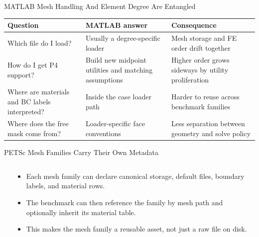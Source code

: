 \documentclass[aspectratio=169,10pt]{beamer}
\begin{document}

\begin{frame}{MATLAB Mesh Handling And Element Degree Are Entangled}
\small
\begin{tabularx}{\textwidth}{p{}p{}Y}
\toprule
\textbf{Question} & \textbf{MATLAB answer} & \textbf{Consequence} \\
\midrule
Which file do I load? & Usually a degree-specific loader & Mesh storage and FE order drift together \\
How do I get P4 support? & Build new midpoint utilities and matching assumptions & Higher order grows sideways by utility proliferation \\
Where are materials and BC labels interpreted? & Inside the case loader path & Harder to reuse across benchmark families \\
Where does the free mask come from? & Loader-specific face conventions & Less separation between geometry and solve policy \\
\bottomrule
\end{tabularx}
\end{frame}

\begin{frame}{PETSc Mesh Families Carry Their Own Metadata}
\small
\begin{columns}[T,totalwidth=\textwidth]
\begin{column}{0.52\textwidth}
\begin{pseudobox}
\\
\\
\\
\\
\\
\\
\code{\}}
\end{pseudobox}
\end{column}
\begin{column}{0.44\textwidth}
\begin{softbox}
\begin{itemize}
  \item Each mesh family can declare canonical storage, default files, boundary labels, and material rows.
  \item The benchmark can then reference the family by mesh path and optionally inherit its material table.
  \item This makes the mesh family a reusable asset, not just a raw file on disk.
\end{itemize}
\end{softbox}
\end{column}
\end{columns}
\end{frame}
\end{document}
